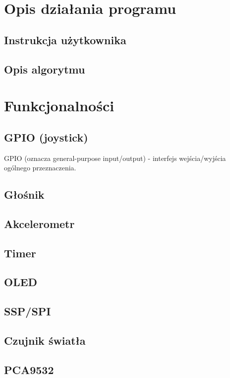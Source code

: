 \documentclass{classrep}
\begin{document}
	\section{Opis działania programu}
	
		\subsection{Instrukcja użytkownika}
		
		\subsection{Opis algorytmu}
		
	\section{Funkcjonalności}
		\subsection{GPIO (joystick)}
		GPIO (oznacza general-purpose input/output) - interfejs wejścia/wyjścia ogólnego przeznaczenia. 
		
		\subsection{Głośnik}
	
		\subsection{Akcelerometr}
	
		
		\subsection{Timer}
		
		\subsection{OLED}
		
		\subsection{SSP/SPI}
		
		\subsection{Czujnik światła}
		
		\subsection{PCA9532}
		
\end{document}
